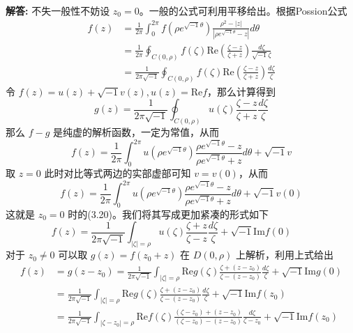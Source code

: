 \documentclass[12pt, a4paper, oneside]{ctexart}
\newcommand{\re}{\mathrm{Re}}
\newenvironment{solution}{\par\noindent\textbf{解答:}}{\par}
\begin{document}
\begin{solution}
    不失一般性不妨设 $z_{0} = 0$。一般的公式可利用平移给出。根据Possion公式
    \begin{align*}
        f(z) &= \frac{1}{2\pi} \int_{0}^{2\pi}f(\rho e^{\sqrt{-1}\theta}) \frac{\rho^{2} -|z|}{|\rho e^{\sqrt{-1}\theta} - z|}d\theta \\
             &= \frac{1}{2\pi} \oint_{C(0,\rho)}f(\zeta)\re(\frac{\zeta - z}{\zeta + z})\frac{d\zeta}{\sqrt{-1}\zeta}\\
             & = \frac{1}{2\pi\sqrt{-1}} \oint_{C(0,\rho)} f(\zeta)\re(\frac{\zeta - z}{\zeta + z})\frac{d\zeta}{\zeta}
    \end{align*}
    令 $f(z) = u(z) + \sqrt{-1}v(z),u(z) = \re f$，那么计算得到
    \begin{equation*}
        g(z) = \frac{1}{2\pi\sqrt{-1}} \oint_{C(0,\rho)}u(\zeta)\frac{\zeta - z}{\zeta + z}\frac{d\zeta}{\zeta} 
    \end{equation*}
    那么 $f-g$ 是纯虚的解析函数，一定为常值，从而
    \begin{equation*}
        f(z) = \frac{1}{2\pi} \int_{0}^{2\pi}u(\rho e^{\sqrt{-1}\theta})\frac{\rho e^{\sqrt{-1}\theta} - z}{\rho e^{\sqrt{-1}\theta} + z}d\theta + \sqrt{-1}v
    \end{equation*}
    取 $z = 0$ 此时对比等式两边的实部虚部可知 $v = v(0)$，从而
    \begin{equation*}
        f(z) = \frac{1}{2\pi} \int_{0}^{2\pi}u(\rho e^{\sqrt{-1}\theta})\frac{\rho e^{\sqrt{-1}\theta} - z}{\rho e^{\sqrt{-1}\theta} + z}d\theta + \sqrt{-1}v(0)
    \end{equation*}
    这就是 $z_{0} = 0$ 时的(3.20)。我们将其写成更加紧凑的形式如下
    \begin{equation*}
        f(z) = \frac{1}{2\pi\sqrt{-1}} \int_{|\zeta|=\rho}u(\zeta)\frac{\zeta + z}{\zeta -z}\frac{d\zeta}{\zeta} + \sqrt{-1}\mathrm{Im}f(0)\qquad \tag*{(SI)}
    \end{equation*}
    对于 $z_{0}\not=0$ 可以取 $g(z) = f(z_{0}+z)$ 在 $D(0,\rho)$ 上解析，利用上式给出
    \begin{align*}
        f(z) &= g(z-z_{0}) = \frac{1}{2\pi\sqrt{-1}} \int_{|\zeta|=\rho}\re g(\zeta)\frac{\zeta + (z-z_{0})}{\zeta -(z-z_{0})}\frac{d\zeta}{\zeta} + \sqrt{-1}\mathrm{Im}g(0)\\
        &=\frac{1}{2\pi\sqrt{-1}} \int_{|\zeta|=\rho}\re g(\zeta)\frac{\zeta + (z-z_{0})}{\zeta -(z-z_{0})}\frac{d\zeta}{\zeta}+ \sqrt{-1}\mathrm{Im}f(z_{0})\\
        &=\frac{1}{2\pi\sqrt{-1}} \int_{|\zeta-z_{0}|=\rho}\re f(\zeta)\frac{(\zeta-z_{0}) + (z-z_{0})}{(\zeta-z_{0}) -(z-z_{0})}\frac{d\zeta}{\zeta-z_{0}}+ \sqrt{-1}\mathrm{Im}f(z_{0})\\

\end{align*}
\end{solution}
\end{document}
